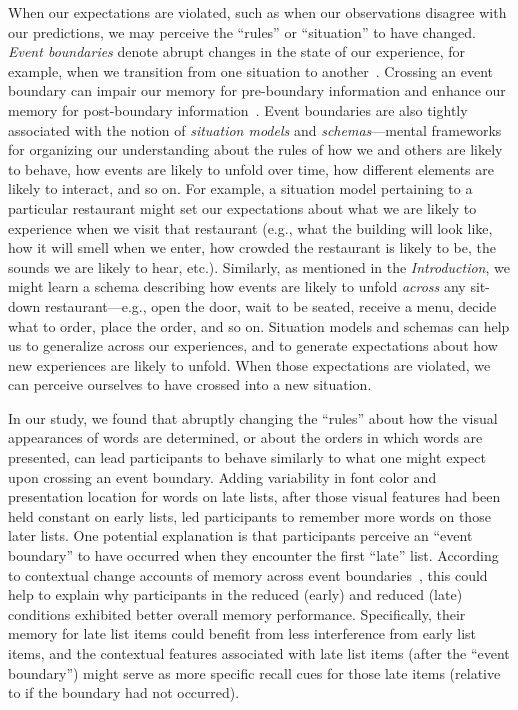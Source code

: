 \documentclass[11pt]{article}
\begin{document}
When our expectations are violated, such as when our observations disagree with
our predictions, we may perceive the ``rules'' or ``situation'' to have
changed. \textit{Event boundaries} denote abrupt changes in the state of our
experience, for example, when we transition from one situation to
another~\citep{RadvZack17, ZwaaRadv98}. Crossing an event boundary can impair
our memory for pre-boundary information and enhance our memory for
post-boundary information~\citep{RadvCope06, SahaKell02, MannEtal16,
DuBrDava13}. Event boundaries are also tightly associated with the notion of
\textit{situation models} and \textit{schemas}---mental frameworks for
organizing our understanding about the rules of how we and others are likely to
behave, how events are likely to unfold over time, how different elements are
likely to interact, and so on. For example, a situation model pertaining to a
particular restaurant might set our expectations about what we are likely to
experience when we visit that restaurant (e.g., what the building will look
like, how it will smell when we enter, how crowded the restaurant is likely to
be, the sounds we are likely to hear, etc.). Similarly, as mentioned in the
\textit{Introduction}, we might learn a schema describing how events are likely
to unfold \textit{across} any sit-down restaurant---e.g., open the door, wait
to be seated, receive a menu, decide what to order, place the order, and so on.
Situation models and schemas can help us to generalize across our experiences,
and to generate expectations about how new experiences are likely to unfold.
When those expectations are violated, we can perceive ourselves to have crossed
into a new situation.

In our study, we found that abruptly changing the ``rules'' about how the
visual appearances of words are determined, or about the orders in which words
are presented, can lead participants to behave similarly to what one might
expect upon crossing an event boundary. Adding variability in font color and
presentation location for words on late lists, after those visual features had
been held constant on early lists, led participants to remember more words on
those later lists. One potential explanation is that participants perceive an
``event boundary'' to have occurred when they encounter the first ``late''
list. According to contextual change accounts of memory across event
boundaries~\citep[e.g.,][]{SahaKell02, PettEtal16, GoldEtal17, FlorEtal17},
this could help to explain why participants in the reduced (early) and reduced
(late) conditions exhibited better overall memory performance. Specifically,
their memory for late list items could benefit from less interference from
early list items, and the contextual features associated with late list items
(after the ``event boundary'') might serve as more specific recall cues for
those late items (relative to if the boundary had not occurred).
\end{document}
